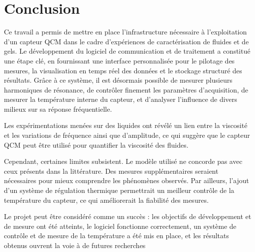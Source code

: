 \chapter{Conclusion}

Ce travail a permis de mettre en place l’infrastructure nécessaire à l’exploitation d’un capteur QCM dans le cadre d’expériences de caractérisation de fluides et de gels. Le développement du logiciel de communication et de traitement a constitué une étape clé, en fournissant une interface personnalisée pour le pilotage des mesures, la visualisation en temps réel des données et le stockage structuré des résultats. Grâce à ce système, il est désormais possible de mesurer plusieurs harmoniques de résonance, de contrôler finement les paramètres d’acquisition, de mesurer la température interne du capteur, et d’analyser l’influence de divers milieux sur sa réponse fréquentielle.

Les expérimentations menées sur des liquides ont révélé un lien entre la viscosité et les variations de fréquence ainsi que d’amplitude, ce qui suggère que le capteur QCM peut être utilisé pour quantifier la viscosité des fluides.

Cependant, certaines limites subsistent. Le modèle utilisé ne concorde pas avec ceux présents dans la littérature. Des mesures supplémentaires seraient nécessaires pour mieux comprendre les phénomènes observés. Par ailleurs, l’ajout d’un système de régulation thermique permettrait un meilleur contrôle de la température du capteur, ce qui améliorerait la fiabilité des mesures.

Le projet peut être considéré comme un succès : les objectifs de développement et de mesure ont été atteints, le logiciel fonctionne correctement, un système de contrôle et de mesure de la température a été mis en place, et les résultats obtenus ouvrent la voie à de futures recherches

\vfil
\hspace{8cm}\makeatletter\@author\makeatother\par
\hspace{8cm}\begin{minipage}{5cm}
    \printsignature
\end{minipage}